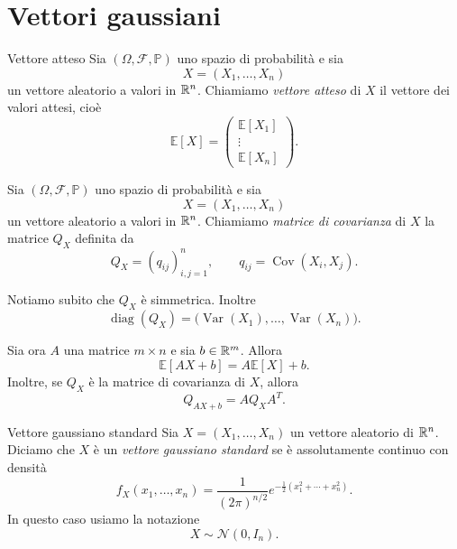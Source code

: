 \documentclass[a4paper]{article}
\begin{document}
\section{Vettori gaussiani}

\begin{snippetdefinition}{Vettore atteso}
    Sia \((\Omega,\mathcal F,\mathbb P)\) uno spazio di probabilità e sia
    \[
        X=(X_1,\ldots,X_n)
    \]
    un vettore aleatorio a valori in \(\mathbb{R}^n\).
    Chiamiamo \emph{vettore atteso} di \(X\) il vettore dei valori attesi, cioè
    \[
        \mathbb E[X]
        =
        \begin{pmatrix}
            \mathbb E[X_1]\\
            \vdots\\
            \mathbb E[X_n]
        \end{pmatrix}.
    \]
\end{snippetdefinition}

\begin{snippetdefinition}{}
    Sia \((\Omega,\mathcal F,\mathbb P)\) uno spazio di probabilità e sia
    \[
        X=(X_1,\ldots,X_n)
    \]
    un vettore aleatorio a valori in \(\mathbb{R}^n\).
    Chiamiamo \emph{matrice di covarianza} di \(X\) la matrice \(Q_X\) definita da
    \[
        Q_X
        =
        (q_{ij})_{i,j=1}^n,
        \qquad
        q_{ij}
        =
        \operatorname{Cov}(X_i,X_j).
    \]
\end{snippetdefinition}

Notiamo subito che \(Q_X\) è simmetrica. Inoltre
\[
    \operatorname{diag}(Q_X)
    =
    \bigl(
        \operatorname{Var}(X_1),
        \ldots,
        \operatorname{Var}(X_n)
    \bigr).
\]

Sia ora \(A\) una matrice \(m\times n\) e sia \(b\in\mathbb{R}^m\). Allora
\[
    \mathbb E[AX+b]
    =
    A\mathbb E[X]+b.
\]
Inoltre, se \(Q_X\) è la matrice di covarianza di \(X\), allora
\[
    Q_{AX+b}
    =
    AQ_XA^T.
\]

\begin{snippetdefinition}{Vettore gaussiano standard}
    Sia \(X=(X_1,\ldots,X_n)\) un vettore aleatorio di \(\mathbb{R}^n\).
    Diciamo che \(X\) è un \emph{vettore gaussiano standard} se è assolutamente continuo con densità
    \[
        f_X(x_1,\ldots,x_n)
        =
        \frac{1}{(2\pi)^{n/2}}
        e^{-\frac12(x_1^2+\cdots+x_n^2)}.
    \]
    In questo caso usiamo la notazione
    \[
        X\sim\mathcal N(0,I_n).
    \]
\end{snippetdefinition}
\end{document}
